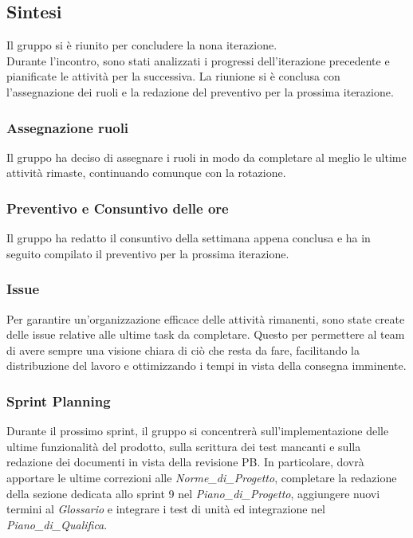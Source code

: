\documentclass[10pt]{article}
\begin{document}
\subsection{Sintesi}
Il gruppo si è riunito per concludere la nona iterazione.\\
Durante l'incontro, sono stati analizzati i progressi dell'iterazione precedente e pianificate le attività per la successiva. La riunione si è conclusa con l'assegnazione dei ruoli e la redazione del preventivo per la prossima iterazione.

\subsubsection{Assegnazione ruoli}
Il gruppo ha deciso di assegnare i ruoli in modo da completare al meglio le ultime attività rimaste, continuando comunque con la rotazione.

\subsubsection{Preventivo e Consuntivo delle ore}
Il gruppo ha redatto il consuntivo della settimana appena conclusa e ha in seguito compilato il preventivo per la prossima iterazione.

\subsubsection{Issue}
Per garantire un'organizzazione efficace delle attività rimanenti, sono state create delle issue relative alle ultime task da completare. Questo per permettere al team di avere sempre una visione chiara di ciò che resta da fare, facilitando la distribuzione del lavoro e ottimizzando i tempi in vista della consegna imminente.

\subsubsection{Sprint Planning}
Durante il prossimo sprint, il gruppo si concentrerà sull'implementazione delle ultime funzionalità del prodotto, sulla scrittura dei test mancanti e sulla redazione dei documenti in vista della revisione PB. In particolare, dovrà apportare le ultime correzioni alle \textit{Norme\_di\_Progetto}, completare la redazione della sezione dedicata allo sprint 9 nel \textit{Piano\_di\_Progetto}, aggiungere nuovi termini al \textit{Glossario} e integrare i test di unità ed integrazione nel \textit{Piano\_di\_Qualifica}.
\end{document}
